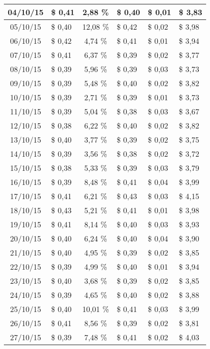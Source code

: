 \begin{center}
\begin{small}
\begin{longtable}{|c|l|c|l|l|l|}
04/10/15 & \$ 0,41 & 2,88 \% & \$ 0,40 & \$ 0,01 & \$ 3,83 \\ \hline
05/10/15 & \$ 0,40 & 12,08 \% & \$ 0,42 & \$ 0,02 & \$ 3,98 \\ \hline
06/10/15 & \$ 0,42 & 4,74 \% & \$ 0,41 & \$ 0,01 & \$ 3,94 \\ \hline
07/10/15 & \$ 0,41 & 6,37 \% & \$ 0,39 & \$ 0,02 & \$ 3,77 \\ \hline
08/10/15 & \$ 0,39 & 5,96 \% & \$ 0,39 & \$ 0,03 & \$ 3,73 \\ \hline
09/10/15 & \$ 0,39 & 5,48 \% & \$ 0,40 & \$ 0,02 & \$ 3,82 \\ \hline
10/10/15 & \$ 0,39 & 2,71 \% & \$ 0,39 & \$ 0,01 & \$ 3,73 \\ \hline
11/10/15 & \$ 0,39 & 5,04 \% & \$ 0,38 & \$ 0,03 & \$ 3,67 \\ \hline
12/10/15 & \$ 0,38 & 6,22 \% & \$ 0,40 & \$ 0,02 & \$ 3,82 \\ \hline
13/10/15 & \$ 0,40 & 3,77 \% & \$ 0,39 & \$ 0,02 & \$ 3,75 \\ \hline
14/10/15 & \$ 0,39 & 3,56 \% & \$ 0,38 & \$ 0,02 & \$ 3,72 \\ \hline
15/10/15 & \$ 0,38 & 5,33 \% & \$ 0,39 & \$ 0,03 & \$ 3,79 \\ \hline
16/10/15 & \$ 0,39 & 8,48 \% & \$ 0,41 & \$ 0,04 & \$ 3,99 \\ \hline
17/10/15 & \$ 0,41 & 6,21 \% & \$ 0,43 & \$ 0,03 & \$ 4,15 \\ \hline
18/10/15 & \$ 0,43 & 5,21 \% & \$ 0,41 & \$ 0,01 & \$ 3,98 \\ \hline
19/10/15 & \$ 0,41 & 8,14 \% & \$ 0,40 & \$ 0,03 & \$ 3,93 \\ \hline
20/10/15 & \$ 0,40 & 6,24 \% & \$ 0,40 & \$ 0,04 & \$ 3,90 \\ \hline
21/10/15 & \$ 0,40 & 4,95 \% & \$ 0,39 & \$ 0,02 & \$ 3,85 \\ \hline
22/10/15 & \$ 0,39 & 4,99 \% & \$ 0,40 & \$ 0,01 & \$ 3,94 \\ \hline
23/10/15 & \$ 0,40 & 3,68 \% & \$ 0,39 & \$ 0,02 & \$ 3,85 \\ \hline
24/10/15 & \$ 0,39 & 4,65 \% & \$ 0,40 & \$ 0,02 & \$ 3,88 \\ \hline
25/10/15 & \$ 0,40 & 10,01 \% & \$ 0,41 & \$ 0,03 & \$ 3,99 \\ \hline
26/10/15 & \$ 0,41 & 8,56 \% & \$ 0,39 & \$ 0,02 & \$ 3,81 \\ \hline
27/10/15 & \$ 0,39 & 7,48 \% & \$ 0,41 & \$ 0,02 & \$ 4,03 \\ \hline

\end{longtable}
\end{small}
\end{center}
